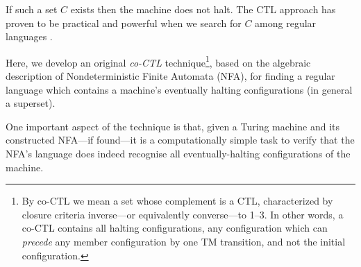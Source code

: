 If such a set $C$ exists then the machine does not halt.
The CTL approach has proven to be practical and powerful when we search for $C$ among regular languages \cite{ShawnCTL} \cite{BruteforceCTL}.

Here, we develop an original \textit{co-CTL} technique\footnote{By co-CTL we mean a set whose complement is a CTL, characterized by closure criteria inverse---or equivalently converse---to 1--3. In other words, a co-CTL contains all halting configurations, any configuration which can \emph{precede} any member configuration by one TM transition, and not the initial configuration.}, based on the algebraic description of Nondeterministic Finite Automata (NFA), for finding a regular language which contains a machine's eventually halting configurations (in general a superset).

One important aspect of the technique is that, given a Turing machine and its constructed NFA---if found---it is a computationally simple task to verify that the NFA's language does indeed recognise all eventually-halting configurations of the machine.


\usetikzlibrary {automata, positioning}

